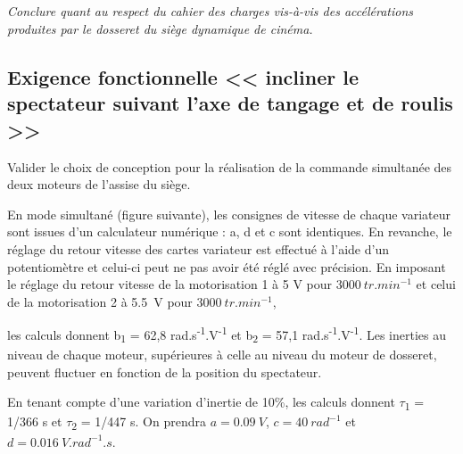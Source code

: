 \documentclass[10pt,fleqn]{article} %
\begin{document}
\begin{multicols}{2}
\subparagraph{}\textit{Conclure quant au respect du cahier des charges vis-à-vis des
  accélérations produites par le dosseret du siège dynamique de cinéma.}
\ifprof
\begin{corrige}
\end{corrige}
\else
\fi


\subsection*{Exigence fonctionnelle << incliner le spectateur suivant l'axe de tangage et de roulis >>}
%


\begin{obj}

Valider le choix de conception pour la réalisation de la commande simultanée des deux moteurs de l'assise du siège.
\end{obj}

En mode simultané (figure suivante), les consignes de vitesse de chaque
variateur sont issues d'un calculateur numérique : a, d et c sont
identiques. En revanche, le réglage du retour vitesse des cartes
variateur est effectué à l'aide d'un potentiomètre et celui-ci peut ne
pas avoir été réglé avec précision. En imposant le réglage du retour
vitesse de la motorisation 1 à 5 V pour $\SI{3000}{tr.min^{-1}}$
et celui de la motorisation 2 à \SI{5,5}{V} pour $\SI{3000}{tr. min^{-1}}$,

les calculs donnent b\textsubscript{1} = 62,8
rad.s\textsuperscript{-1}.V\textsuperscript{-1} et b\textsubscript{2} =
57,1 rad.s\textsuperscript{-1}.V\textsuperscript{-1}. Les inerties au
niveau de chaque moteur, supérieures à celle au niveau du moteur de
dosseret, peuvent fluctuer en fonction de la position du spectateur.

En tenant compte d'une variation d'inertie de 10\%, les calculs donnent
$\tau$\textsubscript{1} = 1/366 s et $\tau$\textsubscript{2} = 1/447 s. On prendra
$a =\SI{0,09}{V}$, $c =\SI{40}{rad^{-1}}$ et $d = \SI{0,016}{V.rad^{-1}.s}$.



\end{multicols}
\end{document}
